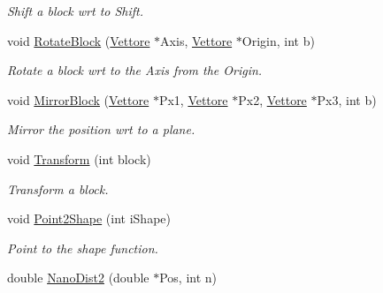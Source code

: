 \begin{DoxyCompactItemize}
\begin{DoxyCompactList}\small\item\em Shift a block wrt to Shift. \end{DoxyCompactList}\item 
void \hyperlink{classVarData_a8602c7e077f0ad0c35efd44090c806d3}{Rotate\+Block} (\hyperlink{classVettore}{Vettore} $\ast$Axis, \hyperlink{classVettore}{Vettore} $\ast$Origin, int b)\hypertarget{classVarData_a8602c7e077f0ad0c35efd44090c806d3}{}\label{classVarData_a8602c7e077f0ad0c35efd44090c806d3}

\begin{DoxyCompactList}\small\item\em Rotate a block wrt to the Axis from the Origin. \end{DoxyCompactList}\item 
void \hyperlink{classVarData_a7dd5faafc8618ecad7bb716db99cdd58}{Mirror\+Block} (\hyperlink{classVettore}{Vettore} $\ast$Px1, \hyperlink{classVettore}{Vettore} $\ast$Px2, \hyperlink{classVettore}{Vettore} $\ast$Px3, int b)\hypertarget{classVarData_a7dd5faafc8618ecad7bb716db99cdd58}{}\label{classVarData_a7dd5faafc8618ecad7bb716db99cdd58}

\begin{DoxyCompactList}\small\item\em Mirror the position wrt to a plane. \end{DoxyCompactList}\item 
void \hyperlink{classVarData_aa63b2c1f38f3684a08db6394f92707f1}{Transform} (int block)\hypertarget{classVarData_aa63b2c1f38f3684a08db6394f92707f1}{}\label{classVarData_aa63b2c1f38f3684a08db6394f92707f1}

\begin{DoxyCompactList}\small\item\em Transform a block. \end{DoxyCompactList}\item 
void \hyperlink{classVarData_acd4e4b1e648b7d1ca3a169bb176e9f5c}{Point2\+Shape} (int i\+Shape)\hypertarget{classVarData_acd4e4b1e648b7d1ca3a169bb176e9f5c}{}\label{classVarData_acd4e4b1e648b7d1ca3a169bb176e9f5c}

\begin{DoxyCompactList}\small\item\em Point to the shape function. \end{DoxyCompactList}\item 
double \hyperlink{classVarData_a1dd0baef0ade6f5abcacba0d814f40d8}{Nano\+Dist2} (double $\ast$Pos, int n)\hypertarget{classVarData_a1dd0baef0ade6f5abcacba0d814f40d8}{}\label{classVarData_a1dd0baef0ade6f5abcacba0d814f40d8}


\end{DoxyCompactItemize}
